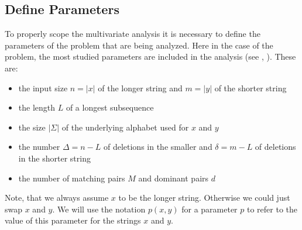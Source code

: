\subsection{Define Parameters}
To properly scope the multivariate analysis it is necessary to define the parameters of the problem that are being analyzed.
Here in the case of the \lcs{} problem, the most studied parameters are included in the analysis (see \cite{Bergroth.2000}, \cite{Paterson.1994}). 
These are:
\begin{itemize}
	\item the input size $n = |x|$ of the longer string and $m = |y|$ of the shorter string
	\item the length $L$ of a longest subsequence
	\item the size $|\Sigma|$ of the underlying alphabet used for $x$ and $y$
	\item the number $\Delta = n - L$ of deletions in the smaller and $\delta = m - L$ of deletions in the shorter string
	\item the number of matching pairs $M$ and dominant pairs $d$
\end{itemize}
Note, that we always assume $x$ to be the longer string. Otherwise we could just swap $x$ and $y$.
We will use the notation $p(x,y)$ for a parameter $p$ to refer to the value of this parameter for the strings $x$ and $y$.

